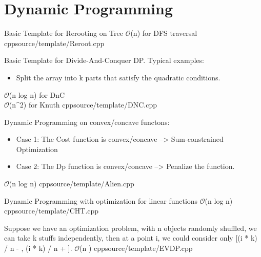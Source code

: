 \section {Dynamic Programming}

{Basic Template for Rerooting on Tree}
{$\mathcal{O}$(n) for DFS traversal}
{cpp}{source/template/Reroot.cpp}


{Basic Template for Divide-And-Conquer DP. Typical examples:
\begin{itemize}
  \item Split the array into k parts that satisfy the quadratic conditions.
\end{itemize}
}
{$\mathcal{O}$(n log n) for DnC \\
 $\mathcal{O}$(n^2) for Knuth}
{cpp}{source/template/DNC.cpp}


{Dynamic Programming on convex/concave functons:
\begin{itemize}
  \item Case 1: The Cost function is convex/concave --> Sum-constrained Optimization
  \item Case 2: The Dp function is convex/concave --> Penalize the function.
\end{itemize}
}
{$\mathcal{O}$(n log n)}
{cpp}{source/template/Alien.cpp}


{Dynamic Programming with optimization for linear functions}
{$\mathcal{O}$(n log n)}
{cpp}{source/template/CHT.cpp}


{Suppose we have an optimization problem, with n objects randomly shuffled, 
 we can take k stuffs independently, then at a point i, 
 we could consider only [(i * k) / n - , (i * k) / n + ].
 }
{$\mathcal{O}$(n )}
{cpp}{source/template/EVDP.cpp}
